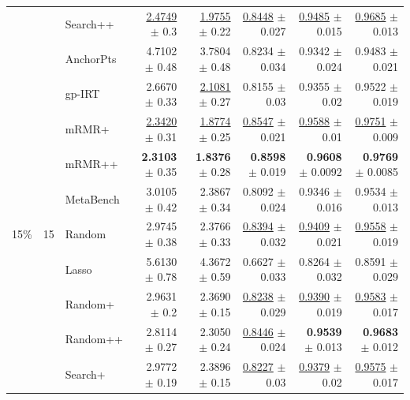\begin{longtable}{llp{}rrrrr}
 &  & Search++ & \underline{2.4749} {\scriptsize $\pm$ 0.3} & \underline{1.9755} {\scriptsize $\pm$ 0.22} & \underline{0.8448} {\scriptsize $\pm$ 0.027} & \underline{0.9485} {\scriptsize $\pm$ 0.015} & \underline{0.9685} {\scriptsize $\pm$ 0.013} \\
 &  & AnchorPts & 4.7102 {\scriptsize $\pm$ 0.48} & 3.7804 {\scriptsize $\pm$ 0.48} & 0.8234 {\scriptsize $\pm$ 0.034} & 0.9342 {\scriptsize $\pm$ 0.024} & 0.9483 {\scriptsize $\pm$ 0.021} \\
 &  & gp-IRT & 2.6670 {\scriptsize $\pm$ 0.33} & \underline{2.1081} {\scriptsize $\pm$ 0.27} & 0.8155 {\scriptsize $\pm$ 0.03} & 0.9355 {\scriptsize $\pm$ 0.02} & 0.9522 {\scriptsize $\pm$ 0.019} \\
 &  & mRMR+ & \underline{2.3420} {\scriptsize $\pm$ 0.31} & \underline{1.8774} {\scriptsize $\pm$ 0.25} & \underline{0.8547} {\scriptsize $\pm$ 0.021} & \underline{0.9588} {\scriptsize $\pm$ 0.01} & \underline{0.9751} {\scriptsize $\pm$ 0.009} \\
 &  & mRMR++ & \textbf{2.3103} {\scriptsize $\pm$ 0.35} & \textbf{1.8376} {\scriptsize $\pm$ 0.28} & \textbf{0.8598} {\scriptsize $\pm$ 0.019} & \textbf{0.9608} {\scriptsize $\pm$ 0.0092} & \textbf{0.9769} {\scriptsize $\pm$ 0.0085} \\
 &  & MetaBench & 3.0105 {\scriptsize $\pm$ 0.42} & 2.3867 {\scriptsize $\pm$ 0.34} & 0.8092 {\scriptsize $\pm$ 0.024} & 0.9346 {\scriptsize $\pm$ 0.016} & 0.9534 {\scriptsize $\pm$ 0.013} \\
\midrule
15\% & 15 & Random & 2.9745 {\scriptsize $\pm$ 0.38} & 2.3766 {\scriptsize $\pm$ 0.33} & \underline{0.8394} {\scriptsize $\pm$ 0.032} & \underline{0.9409} {\scriptsize $\pm$ 0.021} & \underline{0.9558} {\scriptsize $\pm$ 0.019} \\
 &  & Lasso & 5.6130 {\scriptsize $\pm$ 0.78} & 4.3672 {\scriptsize $\pm$ 0.59} & 0.6627 {\scriptsize $\pm$ 0.033} & 0.8264 {\scriptsize $\pm$ 0.032} & 0.8591 {\scriptsize $\pm$ 0.029} \\
 &  & Random+ & 2.9631 {\scriptsize $\pm$ 0.2} & 2.3690 {\scriptsize $\pm$ 0.15} & \underline{0.8238} {\scriptsize $\pm$ 0.029} & \underline{0.9390} {\scriptsize $\pm$ 0.019} & \underline{0.9583} {\scriptsize $\pm$ 0.017} \\
 &  & Random++ & 2.8114 {\scriptsize $\pm$ 0.27} & 2.3050 {\scriptsize $\pm$ 0.24} & \underline{0.8446} {\scriptsize $\pm$ 0.024} & \textbf{0.9539} {\scriptsize $\pm$ 0.013} & \textbf{0.9683} {\scriptsize $\pm$ 0.012} \\
 &  & Search+ & 2.9772 {\scriptsize $\pm$ 0.19} & 2.3896 {\scriptsize $\pm$ 0.15} & \underline{0.8227} {\scriptsize $\pm$ 0.03} & \underline{0.9379} {\scriptsize $\pm$ 0.02} & \underline{0.9575} {\scriptsize $\pm$ 0.017} \\

\end{longtable}
